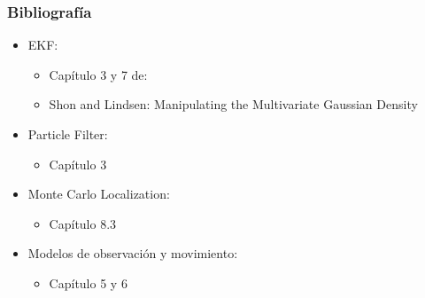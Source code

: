 \begin{frame}
	\frametitle{Bibliografía}
	

    \begin{itemize}

        \item EKF:
        \begin{itemize}
            \item Capítulo 3 y 7 de: \cite{thrun2005probabilistic}
            \item Shon and Lindsen: Manipulating the Multivariate Gaussian Density
        \end{itemize}
        
        \item Particle Filter:
        \begin{itemize}
            \item Capítulo 3 \cite{thrun2005probabilistic}
        \end{itemize}
        

        \item Monte Carlo Localization:
        \begin{itemize}
            \item Capítulo 8.3 \cite{thrun2005probabilistic}
        \end{itemize}
        
        
        \item Modelos de observación y movimiento:
        \begin{itemize}
            \item Capítulo 5 y 6 \cite{thrun2005probabilistic}
        \end{itemize}

    \end{itemize}
	
	\printbibliography
	
\end{frame}
